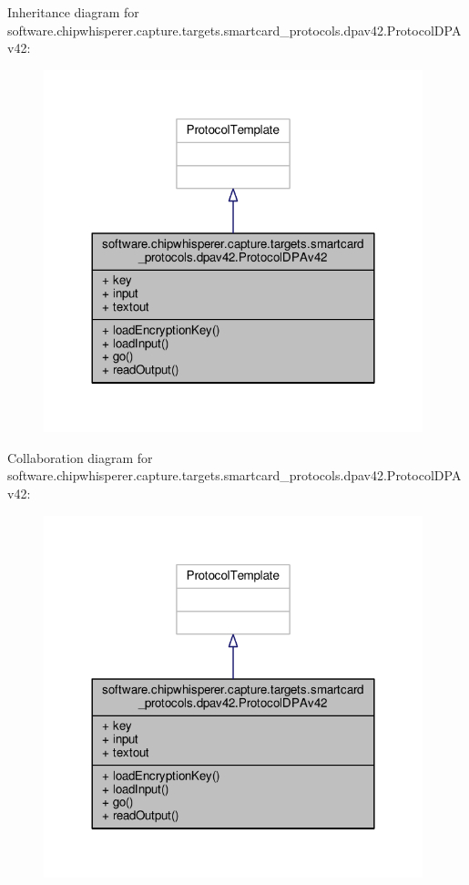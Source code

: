 Inheritance diagram for software.\+chipwhisperer.\+capture.\+targets.\+smartcard\+\_\+protocols.\+dpav42.\+Protocol\+D\+P\+Av42\+:\nopagebreak
\begin{figure}[H]
\begin{center}
\leavevmode
\includegraphics[width=312pt]{de/dac/classsoftware_1_1chipwhisperer_1_1capture_1_1targets_1_1smartcard__protocols_1_1dpav42_1_1ProtocolDPAv42__inherit__graph}
\end{center}
\end{figure}


Collaboration diagram for software.\+chipwhisperer.\+capture.\+targets.\+smartcard\+\_\+protocols.\+dpav42.\+Protocol\+D\+P\+Av42\+:\nopagebreak
\begin{figure}[H]
\begin{center}
\leavevmode
\includegraphics[width=312pt]{da/d3c/classsoftware_1_1chipwhisperer_1_1capture_1_1targets_1_1smartcard__protocols_1_1dpav42_1_1ProtocolDPAv42__coll__graph}
\end{center}
\end{figure}


